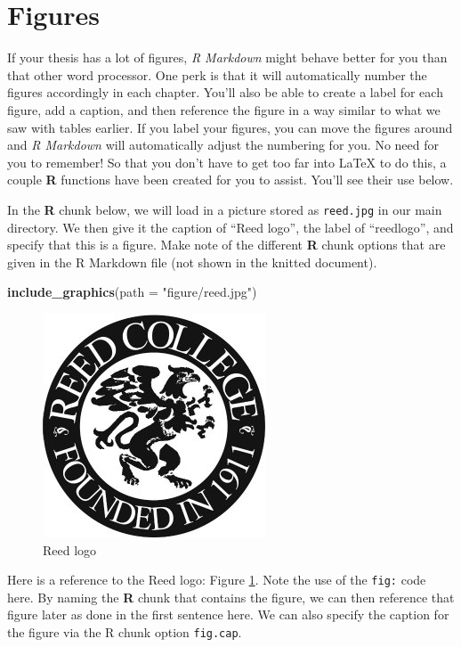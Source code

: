 \documentclass[12pt,twoside]{reedthesis}
\newenvironment{Shaded}{\begin{snugshade}}{\end{snugshade}}
\newcommand{\KeywordTok}[1]{\textcolor[rgb]{0.13,0.29,0.53}{\textbf{{#1}}}}
\newcommand{\DataTypeTok}[1]{\textcolor[rgb]{0.13,0.29,0.53}{{#1}}}
\newcommand{\StringTok}[1]{\textcolor[rgb]{0.31,0.60,0.02}{{#1}}}
\newcommand{\NormalTok}[1]{{#1}}
\theoremstyle{definition}
\theoremstyle{definition}
\theoremstyle{definition}
\theoremstyle{remark}
\begin{document}
\clearpage

\section{Figures}\label{figures}

If your thesis has a lot of figures, \emph{R Markdown} might behave
better for you than that other word processor. One perk is that it will
automatically number the figures accordingly in each chapter. You'll
also be able to create a label for each figure, add a caption, and then
reference the figure in a way similar to what we saw with tables
earlier. If you label your figures, you can move the figures around and
\emph{R Markdown} will automatically adjust the numbering for you. No
need for you to remember! So that you don't have to get too far into
LaTeX to do this, a couple \textbf{R} functions have been created for
you to assist. You'll see their use below.

In the \textbf{R} chunk below, we will load in a picture stored as
\texttt{reed.jpg} in our main directory. We then give it the caption of
``Reed logo'', the label of ``reedlogo'', and specify that this is a
figure. Make note of the different \textbf{R} chunk options that are
given in the R Markdown file (not shown in the knitted document).
\begin{Shaded}
\begin{Highlighting}[]
\KeywordTok{include_graphics}\NormalTok{(}\DataTypeTok{path =} \StringTok{"figure/reed.jpg"}\NormalTok{)}
\end{Highlighting}
\end{Shaded}
\begin{figure}[htbp]
\centering
\includegraphics{figure/reed.jpg}
\caption{\label{fig:reedlogo}Reed logo}
\end{figure}
Here is a reference to the Reed logo: Figure \ref{fig:reedlogo}. Note
the use of the \texttt{fig:} code here. By naming the \textbf{R} chunk
that contains the figure, we can then reference that figure later as
done in the first sentence here. We can also specify the caption for the
figure via the R chunk option \texttt{fig.cap}.
\end{document}
